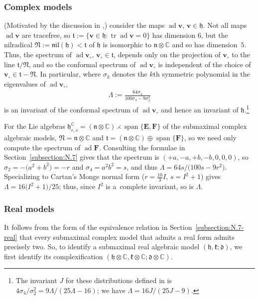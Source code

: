 \documentclass[pdftex]{sigma}
\DeclareMathOperator{\ad} {ad}
\DeclareMathOperator{\spanOperator}{span}
\DeclareMathOperator{\tr} {tr}
\newcommand{\Span}[1]{\spanOperator\{{#1}\}}
\newcommand{\bbC}{\mathbb{C}}
\newcommand{\mbE}{\mathbf{E}}
\newcommand{\mbF}{\mathbf{F}}
\newcommand{\mbv}{\mathbf{v}}
\newcommand{\mfd} {\mathfrak{d}}
\newcommand{\mfh} {\mathfrak{h}}
\newcommand{\mfk} {\mathfrak{k}}
\newcommand{\mfN} {\mathfrak{N}}
\newcommand{\mfn} {\mathfrak{n}}
\newcommand{\mft} {\mathfrak{t}}
\newcommand{\mfnil}{\mathfrak{nil}}
\numberwithin{equation}{section}
\begin{document}
\subsubsection{Complex models}\label{subsubsection:identification-submaximal-complex}
(Motivated by the discussion in \cite[Section~2]{DoubrovKruglikov},) consider the maps $\ad \mbv$, $\mbv \in \mfh$. Not all maps $\ad \mbv$ are tracefree, so $\mft := \{ \mbv \in \mfh \colon \tr \ad \mbv = 0 \}$ has dimension $6$, but the nilradical $\mfN := \mfnil(\mfh) < \mft$ of $\mfh$ is isomorphic to $\mfn \otimes \bbC$ and so has dimension~$5$. Thus, the spectrum of $\ad \mbv_{\circ}$, $\mbv_{\circ} \in \mft$, depends only on the projection of $\mbv_{\circ}$ to the line $\mft / \mfN$, and so the conformal spectrum of $\ad \mbv_{\circ}$ is independent of the choice of $\mbv_{\circ} \in \mft - \mfN$. In particular, where $\sigma_k$ denotes the $k$th symmetric polynomial in the eigenvalues of $\ad \mbv_{\circ}$,
\begin{gather*}
	\boxed{\Lambda := \frac{64 \sigma_4}{100 \sigma_4 - 9 \sigma_2^2}}
\end{gather*}
is an invariant of the conformal spectrum of $\ad \mbv_{\circ}$ and hence an invariant of $\mfh$.\footnote{The invariant $J$ for these distributions defined in \cite{DoubrovKruglikov} is $4 \sigma_4 / \sigma_2^2 = 9 \Lambda / (25 \Lambda - 16)$; we have $\Lambda = 16 J / (25 J - 9)$.}

For the Lie algebras $\mfh_{r, s}^{\bbC} = (\mfn \otimes \bbC) \rightthreetimes \Span{\mbE, \mbF}$ of the submaximal complex algebraic models, $\mfN = \mfn \otimes \bbC$ and $\mft = (\mfn \otimes \bbC) \oplus \Span{\mbF}$, so we need only compute the spectrum of $\ad \mbF$. Consulting the formulae in Section~\ref{subsection:N.7} gives that the spectrum is $(+a, -a, +b, -b, 0, 0, 0)$, so $\sigma_2 = -\big(a^2 + b^2\big) = -r$ and $\sigma_4 = a^2 b^2 = s$, and thus $\Lambda = 64 s / \big(100 s - 9 r^2\big)$. Specializing to Cartan's Monge normal form ($r = \frac{10}{3} I$, $s = I^2 + 1$) gives $\Lambda = 16 \big(I^2 + 1\big) / 25$; thus, since $I^2$ is a~complete invariant, so is $\Lambda$.

\subsubsection{Real models}\label{subsubsection:identification-submaximal-real}

It follows from the form of the equivalence relation in Section~\ref{subsection:N.7-real} that every submaximal complex model that admits a real form admits precisely two. So, to identify a submaximal real algebraic model $(\mfh, \mfk; \mfd)$, we first identify its complexification $(\mfh \otimes \bbC, \mfk \otimes \bbC; \mfd \otimes \bbC)$.
\end{document}
